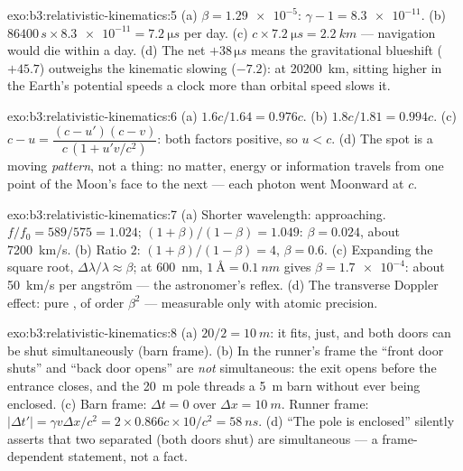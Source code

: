 \begin{solution}{exo:b3:relativistic-kinematics:5}
(a) $\beta = \num{1.29e-5}$: $\gamma - 1 = \num{8.3e-11}$. (b)
$86400\,\unit{s} \times \num{8.3e-11} = \qty{7.2}{\micro s}$ per day.
(c) $c \times \qty{7.2}{\micro s} = \qty{2.2}{km}$ --- navigation
would die within a day. (d) The net $+38\,\unit{\micro s}$ means the
gravitational blueshift ($+45.7$) outweighs the kinematic slowing
($-7.2$): at \qty{20200}{km}, sitting higher in the Earth's potential
speeds a clock more than orbital speed slows it.
\end{solution}

\begin{solution}{exo:b3:relativistic-kinematics:6}
(a) $1.6c/1.64 = 0.976c$. (b) $1.8c/1.81 = 0.994c$. (c) $c - u =
\dfrac{(c - u')(c - v)}{c\,(1 + u'v/c^2)}$: both factors positive, so
$u < c$. (d) The spot is a moving \emph{pattern}, not a thing: no
matter, energy or information travels from one point of the Moon's
face to the next --- each photon went Moonward at $c$.
\end{solution}

\begin{solution}{exo:b3:relativistic-kinematics:7}
(a) Shorter wavelength: approaching. $f/f_0 = 589/575 = 1.024$;
$(1+\beta)/(1-\beta) = 1.049$: $\beta = 0.024$, about
\qty{7200}{km/s}. (b) Ratio $2$: $(1+\beta)/(1-\beta) = 4$, $\beta =
0.6$. (c) Expanding the square root, $\Delta\lambda/\lambda \approx
\beta$; at \qty{600}{nm}, $\qty{1}{\angstrom} = \qty{0.1}{nm}$ gives
$\beta = \num{1.7e-4}$: about \qty{50}{km/s} per angstr\"om --- the
astronomer's reflex. (d) The transverse Doppler effect: pure , of order $\beta^2$ --- measurable only with atomic
precision.
\end{solution}

\begin{solution}{exo:b3:relativistic-kinematics:8}
(a) $20/2 = \qty{10}{m}$: it fits, just, and both doors can be shut
simultaneously (barn frame). (b) In the runner's frame the 
``front door shuts'' and ``back door opens'' are \emph{not}
simultaneous: the exit opens before the entrance closes, and the
\qty{20}{m} pole threads a \qty{5}{m} barn without ever being
enclosed. (c) Barn frame: $\Delta t = 0$ over $\Delta x =
\qty{10}{m}$. Runner frame: $|\Delta t'| = \gamma v\Delta x/c^2 =
2 \times 0.866c \times 10/c^2 = \qty{58}{ns}$. (d) ``The pole is
enclosed'' silently asserts that two separated  (both doors
shut) are simultaneous --- a frame-dependent statement, not a fact.
\end{solution}

